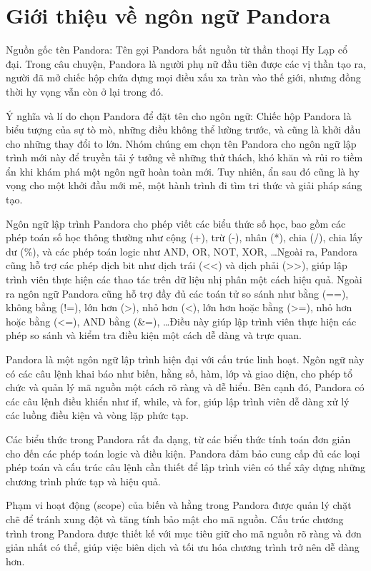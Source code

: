 \section{Giới thiệu về ngôn ngữ Pandora}
Nguồn gốc tên Pandora: 
    Tên gọi Pandora bắt nguồn từ thần thoại 
    Hy Lạp cổ đại. Trong câu chuyện, Pandora là người phụ nữ đầu tiên được 
    các vị thần tạo ra, người đã mở chiếc hộp chứa đựng mọi điều xấu xa tràn 
    vào thế giới, nhưng đồng thời hy vọng vẫn còn ở lại trong đó.

Ý nghĩa và lí do chọn Pandora để đặt tên cho ngôn ngữ: 
    Chiếc hộp Pandora là biểu tượng của sự tò mò, những điều không thể 
    lường trước, và cũng là khởi đầu cho những thay đổi to lớn. Nhóm chúng 
    em chọn tên Pandora cho ngôn ngữ lập trình mới này để truyền tải ý 
    tưởng về những thử thách, khó khăn và rủi ro tiềm ẩn khi khám phá một 
    ngôn ngữ hoàn toàn mới. Tuy nhiên, ẩn sau đó cũng là hy vọng cho một 
    khởi đầu mới mẻ, một hành trình đi tìm tri thức và giải pháp sáng tạo.

Ngôn ngữ lập trình Pandora cho phép viết các biểu thức số học, bao gồm các phép toán số học thông thường như cộng (+), trừ (-), nhân (*), chia (/), chia lấy dư (\%), và các phép toán logic như AND, OR, NOT, XOR, \dots Ngoài ra, Pandora cũng hỗ trợ các phép dịch bit như dịch trái ({<}{<}) và dịch phải ({>}{>}), giúp lập trình viên thực hiện các thao tác trên dữ liệu nhị phân một cách hiệu quả. Ngoài ra ngôn ngữ Pandora cũng hỗ trợ đầy đủ các toán tử so sánh như bằng (==), không bằng (!=), lớn hơn (>), nhỏ hơn (<), lớn hơn hoặc bằng (>=), nhỏ hơn hoặc bằng (<=), AND bằng (\&=), \dots Điều này giúp lập trình viên thực hiện các phép so sánh và kiểm tra điều kiện một cách dễ dàng và trực quan.

Pandora là một ngôn ngữ lập trình hiện đại với cấu trúc linh hoạt. Ngôn ngữ này có các câu lệnh khai báo như biến, hằng số, hàm, lớp và giao diện, cho phép tổ chức và quản lý mã nguồn một cách rõ ràng và dễ hiểu. Bên cạnh đó, Pandora có các câu lệnh điều khiển như if, while, và for, giúp lập trình viên dễ dàng xử lý các luồng điều kiện và vòng lặp phức tạp.
    
Các biểu thức trong Pandora rất đa dạng, từ các biểu thức tính toán đơn giản cho đến các phép toán logic và điều kiện. Pandora đảm bảo cung cấp đủ các loại phép toán và cấu trúc câu lệnh cần thiết để lập trình viên có thể xây dựng những chương trình phức tạp và hiệu quả.

Phạm vi hoạt động (scope) của biến và hằng trong Pandora được quản lý chặt chẽ để tránh xung đột và tăng tính bảo mật cho mã nguồn. Cấu trúc chương trình trong Pandora được thiết kế với mục tiêu giữ cho mã nguồn rõ ràng và đơn giản nhất có thể, giúp việc biên dịch và tối ưu hóa chương trình trở nên dễ dàng hơn.